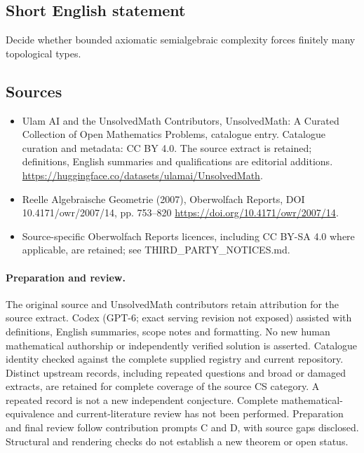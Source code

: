 \documentclass[11pt]{article}
\begin{document}
\subsection{Short English statement}
Decide whether bounded axiomatic semialgebraic complexity forces finitely many topological types.
\subsection{Sources}
\begin{itemize}
\item[\hypertarget{source:statement:1}{S1}] Ulam AI and the UnsolvedMath Contributors, UnsolvedMath: A Curated Collection of Open Mathematics Problems, catalogue entry. Catalogue curation and metadata: CC BY 4.0. The source extract is retained; definitions, English summaries and qualifications are editorial additions.
\url{https://huggingface.co/datasets/ulamai/UnsolvedMath}.
\item[\hypertarget{source:statement:2}{S2}] Reelle Algebraische Geometrie (2007), Oberwolfach Reports, DOI 10.4171/owr/2007/14, pp. 753--820
\url{https://doi.org/10.4171/owr/2007/14}.
\item Source-specific Oberwolfach Reports licences, including CC BY-SA 4.0 where applicable, are retained; see THIRD\_PARTY\_NOTICES.md.
\end{itemize}
\paragraph{Preparation and review.}
The original source and UnsolvedMath contributors retain attribution for the source extract. Codex (GPT-6; exact serving revision not exposed) assisted with definitions, English summaries, scope notes and formatting. No new human mathematical authorship or independently verified solution is asserted. Catalogue identity checked against the complete supplied registry and current repository. Distinct upstream records, including repeated questions and broad or damaged extracts, are retained for complete coverage of the source CS category. A repeated record is not a new independent conjecture. Complete mathematical-equivalence and current-literature review has not been performed. Preparation and final review follow contribution prompts C and D, with source gaps disclosed. Structural and rendering checks do not establish a new theorem or open status.
\label{end:statement}
\end{document}

